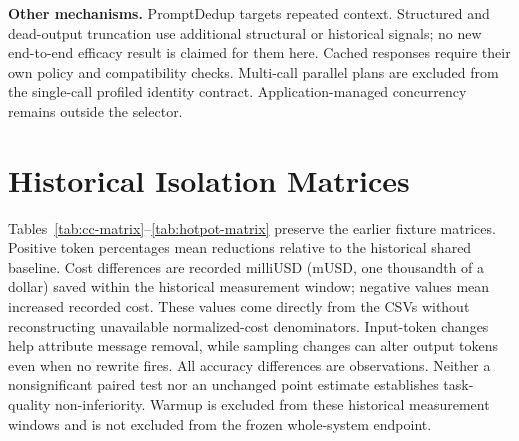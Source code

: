 \textbf{Other mechanisms.} PromptDedup targets repeated context. Structured and
dead-output truncation use additional structural or historical signals; no new
end-to-end efficacy result is claimed for them here. Cached responses require their
own policy and compatibility checks. Multi-call parallel plans are excluded from
the single-call profiled identity contract. Application-managed concurrency remains
outside the selector.

\section{Historical Isolation Matrices}
\label{sec:historical}

Tables~\ref{tab:cc-matrix}--\ref{tab:hotpot-matrix} preserve the earlier fixture
matrices. Positive token percentages mean reductions relative to the historical shared
baseline. Cost differences are recorded milliUSD (mUSD, one thousandth of a dollar)
saved within the historical measurement window; negative values mean increased
recorded cost. These values come directly from the CSVs without reconstructing
unavailable normalized-cost denominators.
Input-token changes help attribute message removal, while sampling changes can
alter output tokens even when no rewrite fires. All accuracy differences are
observations. Neither a nonsignificant paired test nor an unchanged point estimate
establishes task-quality non-inferiority. Warmup is excluded from these historical
measurement windows and is not excluded from the frozen whole-system endpoint.

